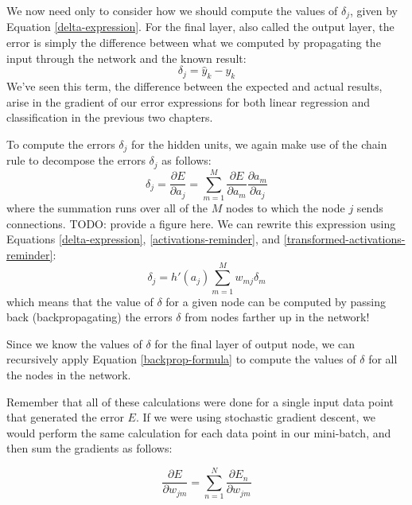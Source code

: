We now need only to consider how we should compute the values of $\delta_{j}$, given by Equation \ref{delta-expression}.
For the final layer, also called the output layer, the error is simply the difference between what we computed by propagating the input through the network and the known result:
\begin{equation*}
	\delta_{j} = \hat{y}_{k} - y_{k}
\end{equation*}
We've seen this term, the difference between the expected and actual results, arise in the gradient of our error expressions for both linear regression and classification in the previous two chapters.

To compute the errors $\delta_{j}$ for the hidden units, we again make use of the chain rule to decompose the errors $\delta_{j}$ as follows:
\begin{equation} \label{backprop-for-deltas}
	\delta_{j} = \frac{\partial E}{\partial a_{j}} = \sum_{m=1}^{M} \frac{\partial E}{\partial a_{m}} \frac{\partial a_{m}}{\partial a_{j}} 
\end{equation}
where the summation runs over all of the $M$ nodes to which the node $j$ sends connections. TODO: provide a figure here. We can rewrite this expression using Equations \ref{delta-expression}, \ref{activations-reminder}, and \ref{transformed-activations-reminder}:
\begin{equation} \label{backprop-formula}
	\delta_{j} = h'(a_{j}) \sum_{m=1}^{M} w_{mj} \delta_{m}
\end{equation}
which means that the value of $\delta$ for a given node can be computed by passing back (backpropagating) the errors $\delta$ from nodes farther up in the network!

Since we know the values of $\delta$ for the final layer of output node, we can recursively apply Equation \ref{backprop-formula} to compute the values of $\delta$ for all the nodes in the network.

Remember that all of these calculations were done for a single input data point that generated the error $E$. If we were using stochastic gradient descent, we would perform the same calculation for each data point in our mini-batch, and then sum the gradients as follows:

\begin{equation} \label{batch-errors-backprop}
	\frac{\partial E}{\partial w_{jm}} = \sum_{n=1}^{N} \frac{\partial E_{n}}{\partial w_{jm}}
\end{equation}

